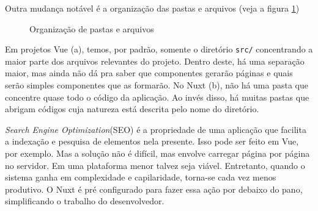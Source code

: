 Outra mudança notável é a organização das pastas e arquivos (veja a figura \ref{fig:file-system})

\begin{figure}[htb]
    \centering
    \caption{Organização de pastas e arquivos}
    \label{fig:file-system}
\end{figure}

Em projetos Vue (a), temos, por padrão, somente o diretório \texttt{src/} concentrando a maior parte
dos arquivos relevantes do projeto. Dentro deste, há uma separação maior, mas ainda não dá pra saber
que componentes gerarão páginas e quais serão simples componentes que as formarão. No Nuxt (b), não
há uma pasta que concentre quase todo o código da aplicação. Ao invés disso, há muitas pastas que
abrigam códigos cuja natureza está descrita pelo nome do diretório.

\emph{Search Engine Optimization}(SEO) é a propriedade de uma aplicação que facilita a  indexação e
pesquisa de elementos nela presente. Isso pode ser feito em Vue, por exemplo. Mas a solução não é
difícil, mas envolve carregar página por página no servidor. Em uma plataforma menor talvez seja
viável. Entretanto, quando o sistema ganha em complexidade e capilaridade, torna-se cada vez menos
produtivo. O Nuxt é pré configurado para fazer essa ação por debaixo do pano, simplificando o
trabalho do desenvolvedor.

